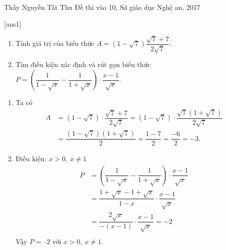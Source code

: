 \begin{name}
{Thầy  Nguyễn Tất Thu}
{Đề thi vào 10, Sở giáo dục Nghệ an, 2017}
\end{name}
\setcounter{ex}{0}
[ans1]
\begin{ex}%
\hfill  
    \begin{enumerate}
        \item Tính giá trị của biểu thức $A=\left(1-\sqrt{7}\right)\dfrac{\sqrt{7}+7}{2\sqrt{7}}$.
        \item Tìm điều kiện xác định và rút gọn biểu thức $P=\left(\dfrac{1}{1-\sqrt{x}}-\dfrac{1}{1+\sqrt{x}} \right)\cdot \dfrac{x-1}{\sqrt{x}}.$
    \end{enumerate}
\loigiai
    {
    \begin{enumerate}
        \item Ta có 
        $$\begin{aligned}
  A&=\left( 1-\sqrt{7} \right)\cdot \dfrac{\sqrt{7}+7}{2\sqrt{7}}=\left( 1-\sqrt{7} \right)\cdot \dfrac{\sqrt{7}\left( 1+\sqrt{7} \right)}{2\sqrt{7}}\\&=\dfrac{\left( 1-\sqrt{7} \right)\left( 1+\sqrt{7} \right)}{2}  =\dfrac{1-7}{2}=\dfrac{-6}{2}=-3.  \end{aligned}$$

        \item Điều kiện: $x>0,\ x\ne 1$
$$\begin{aligned}
  P&=\left( \dfrac{1}{1-\sqrt{x}}-\dfrac{1}{1+\sqrt{x}} \right)\cdot \dfrac{x-1}{\sqrt{x}}\\&=\dfrac{1+\sqrt{x}-1+\sqrt{x}}{1-x}\cdot \dfrac{x-1}{\sqrt{x}} \\ 
 & =\dfrac{2\sqrt{x}}{-(x-1)}\cdot \dfrac{x-1}{\sqrt{x}}=-2 \\ 
\end{aligned}$$
Vậy $P = – 2$ với $x>0,\ x\ne 1$.
    \end{enumerate}
    }
\end{ex}

